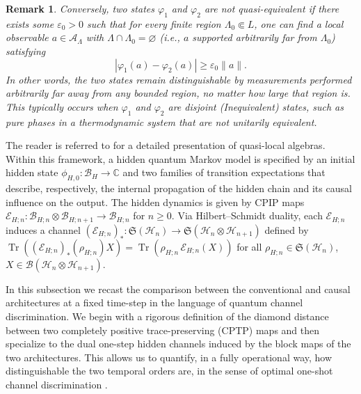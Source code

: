 \documentclass[11pt, reco]{article}
\newtheorem{remark}[theorem]{Remark}
\begin{document}
\begin{remark} 
Conversely, two states $\varphi_1$ and $\varphi_2$ are \emph{not quasi-equivalent} if there exists some $\varepsilon_0 > 0$ such that for every finite region $\Lambda_0 \Subset L$, one can find a local observable $a \in \mathcal{A}_\Lambda$ with $\Lambda \cap \Lambda_0 = \varnothing$ (i.e., $a$ supported arbitrarily far from $\Lambda_0$) satisfying
\[
|\varphi_1(a) - \varphi_2(a)| \ge \varepsilon_0 \|a\|.
\]
In other words, the two states remain distinguishable by measurements performed arbitrarily far away from any bounded region, no matter how large that region is. This typically occurs when $\varphi_1$ and $\varphi_2$ are disjoint (Inequivalent)  states, such as pure phases in a thermodynamic system that are not unitarily equivalent.
\end{remark}

The reader is referred to \cite{BR} for a detailed presentation of quasi-local algebras.
 Within this framework, a hidden quantum Markov model is specified by an initial hidden state \(\phi_{H,0}:\mathcal{B}_H\to\mathbb{C}\) and two families of transition expectations that describe, respectively, the internal propagation of the hidden chain and its causal influence on the output. The hidden dynamics is given by CPIP maps \(\mathcal{E}_{H;n}:\mathcal{B}_{H;n}\otimes\mathcal{B}_{H;n+1}\to\mathcal{B}_{H;n}\) for \(n\ge 0\). Via Hilbert–Schmidt duality, each \(\mathcal{E}_{H;n}\) induces a channel \((\mathcal{E}_{H;n})_*:\mathfrak{S}(\mathcal{H}_n)\to\mathfrak{S}(\mathcal{H}_n\otimes\mathcal{H}_{n+1})\) defined by \(\operatorname{Tr}((\mathcal{E}_{H;n})_*(\rho_{H;n})X)=\operatorname{Tr}(\rho_{H;n}\,\mathcal{E}_{H;n}(X))\) for all \(\rho_{H;n}\in\mathfrak{S}(\mathcal{H}_n)\), \(X\in\mathcal{B}(\mathcal{H}_n\otimes\mathcal{H}_{n+1})\).


In this subsection we recast the comparison between the conventional and causal architectures at a fixed time-step in the language of quantum channel discrimination. We begin with a rigorous definition of the diamond distance between two completely positive trace-preserving (CPTP) maps and then specialize to the dual one-step hidden channels induced by the block maps of the two architectures. This allows us to quantify, in a fully operational way, how distinguishable the two temporal orders are, in the sense of optimal one-shot channel discrimination \cite{PLLP19}.
\end{document}
